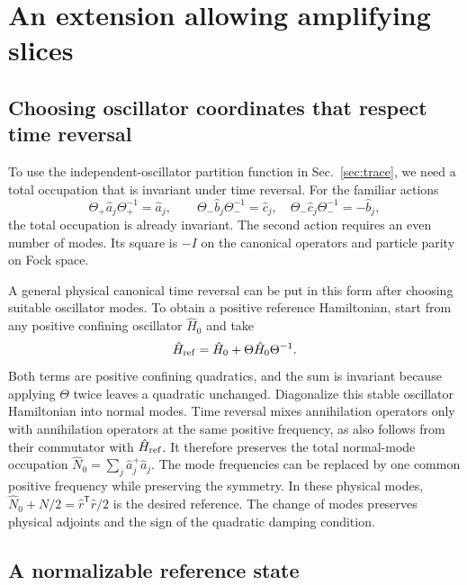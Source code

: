 \documentclass[11pt,a4paper]{article}
\newcommand{\trans}{\mathsf T}
\numberwithin{equation}{section}
\begin{document}
\section{An extension allowing amplifying slices}
\label{app:vacuum}
\subsection{Choosing oscillator coordinates that respect time reversal}
\label{sec:reference}

To use the independent-oscillator partition function in
Sec.~\ref{sec:trace}, we need a total occupation that is invariant under
time reversal. For the familiar actions
\begin{equation}
 \Theta_+\hat a_j\Theta_+^{-1}=\hat a_j,\qquad
 \Theta_-\hat b_j\Theta_-^{-1}=\hat c_j,\quad
 \Theta_-\hat c_j\Theta_-^{-1}=-\hat b_j,
 \label{eq:two_actions}
\end{equation}
the total occupation is already invariant. The second action requires an
even number of modes. Its square is $-I$ on the canonical operators and
particle parity on Fock space.

A general physical canonical time reversal can be put in this form after
choosing suitable oscillator modes. To obtain a positive reference
Hamiltonian, start from any positive confining oscillator $\hat H_0$ and
take
\begin{equation}
 \hat H_{\rm ref}=\hat H_0+\Theta\hat H_0\Theta^{-1}.
 \label{eq:reference_hamiltonian}
\end{equation}
Both terms are positive confining quadratics, and the sum is invariant
because applying $\Theta$ twice leaves a quadratic unchanged. Diagonalize
this stable oscillator Hamiltonian into normal modes. Time reversal
mixes annihilation operators only with annihilation operators at the same
positive frequency, as also follows from their commutator with
$\hat H_{\rm ref}$. It therefore preserves the total normal-mode
occupation $\hat N_0=\sum_j\hat a_j^+\hat a_j$.
The mode frequencies can be replaced by one common positive frequency
while preserving the symmetry. In these physical modes,
$\hat N_0+N/2=\hat r^\trans\hat r/2$ is the desired reference.
The change of modes preserves physical adjoints and the sign of the
quadratic damping condition.

\subsection{A normalizable reference state}
\label{sec:vacuum}
\end{document}
